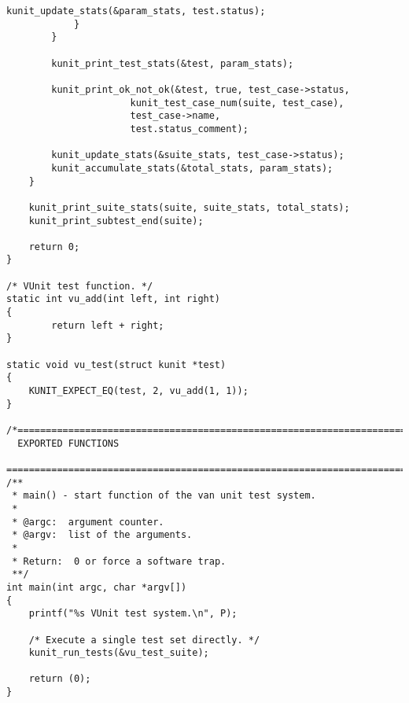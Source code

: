 \documentclass{article}
\begin{document}
\begin{lstlisting}[style=CStyle]
				kunit_update_stats(&param_stats, test.status);
			}
		}

		kunit_print_test_stats(&test, param_stats);

		kunit_print_ok_not_ok(&test, true, test_case->status,
				      kunit_test_case_num(suite, test_case),
				      test_case->name,
				      test.status_comment);

		kunit_update_stats(&suite_stats, test_case->status);
		kunit_accumulate_stats(&total_stats, param_stats);
	}

	kunit_print_suite_stats(suite, suite_stats, total_stats);
	kunit_print_subtest_end(suite);

	return 0;
}

/* VUnit test function. */
static int vu_add(int left, int right)
{
        return left + right;
}

static void vu_test(struct kunit *test)
{
	KUNIT_EXPECT_EQ(test, 2, vu_add(1, 1));
}

/*============================================================================
  EXPORTED FUNCTIONS
  ============================================================================*/
/**
 * main() - start function of the van unit test system.
 *
 * @argc:  argument counter.
 * @argv:  list of the arguments.
 *
 * Return:	0 or force a software trap.
 **/
int main(int argc, char *argv[])
{
	printf("%s VUnit test system.\n", P);
	
	/* Execute a single test set directly. */
	kunit_run_tests(&vu_test_suite);
	
	return (0);
}
\end{lstlisting}
\end{document}
